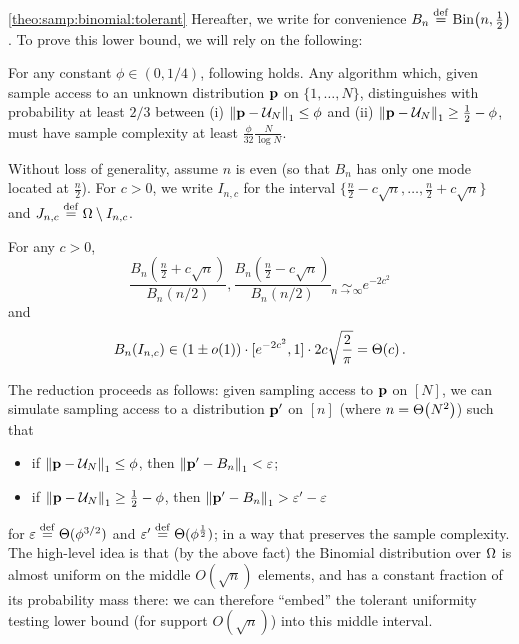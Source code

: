 \begin{proofof}{\cref{theo:samp:binomial:tolerant}}
Hereafter, we write for convenience $B_n\stackrel{\rm def}{=} \operatorname{Bin}\!\left( n, \frac{1}{2} \right)$. To prove this lower bound, we will rely on the following:
\begin{theorem}\label{theo:samp:uniformity:tolerant}
  For any constant $\phi\in(0,1/4)$, following holds. Any algorithm which, given sample access to an unknown distribution $\mathbf{p}$ on $\{1,\dots,N\}$, distinguishes with probability at least $2/3$ between \textsf{(i)} ${\lVert\mathbf{p} - \mathcal{U}_N{\rVert}}_1 \leq \phi$ and \textsf{(ii)} ${\lVert\mathbf{p} - \mathcal{U}_N{\rVert}}_1 \geq \frac{1}{2}-\phi$, must have sample complexity at least $\frac{\phi}{32}\frac{N}{\log N}$.
\end{theorem}

Without loss of generality, assume $n$ is even (so that $B_n$ has only one mode located at $\frac{n}{2}$). For $c>0$, we write $I_{n,c}$ for the interval $\{\frac{n}{2}-c\sqrt{n},\dots,\frac{n}{2}+c\sqrt{n}\}$ and $J_{n,c}\stackrel{\rm def}{=}{\Omega}\setminus I_{n,c}$.
\begin{fact}\label{fact:easy:binomial}
For any $c > 0$, \[
\frac{B_n(\frac{n}{2} + c\sqrt{n})}{B_n({n}/{2})}, \frac{B_n(\frac{n}{2} - c\sqrt{n})}{B_n({n}/{2})} \operatorname*{\sim}_{n\to\infty} e^{-2c^2} \]
and 
\[
B_n(I_{n,c}) \in (1\pm o(1))\cdot[e^{-2c^2},1]\cdot 2c\sqrt{\frac{2}{\pi}} = \bigTheta{c}\,.
\]
\end{fact}

The reduction proceeds as follows: given sampling access to $\mathbf{p}$ on $[N]$, we can simulate sampling access to a distribution $\mathbf{p}^\prime$ on $[n]$ (where $n=\bigTheta{N^2}$) such that
\begin{itemize}
  \item if ${\lVert\mathbf{p} - \mathcal{U}_N{\rVert}}_1 \leq \phi$, then ${\lVert\mathbf{p}^\prime - B_n{\rVert}}_1 < \varepsilon$;
  \item if ${\lVert\mathbf{p} - \mathcal{U}_N{\rVert}}_1 \geq \frac{1}{2}-\phi$, then ${\lVert\mathbf{p}^\prime - B_n{\rVert}}_1 > \varepsilon^\prime - \varepsilon$
\end{itemize}
for $\varepsilon \stackrel{\rm def}{=} \Theta(\phi^{3/2})$ and $\varepsilon^\prime \stackrel{\rm def}{=} \Theta(\phi^{\frac{1}{2}})$; in a way that preserves the sample complexity. The high-level idea is that (by the above fact) the Binomial distribution over ${\Omega}$ is almost uniform on the middle $O(\sqrt{n})$ elements, and has a constant fraction of its probability mass there: we can therefore ``embed'' the tolerant uniformity testing lower bound (for support $O(\sqrt{n})$) into this middle interval.\smallskip


\end{proofof}
